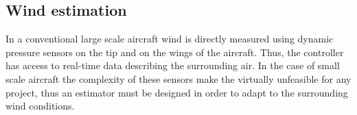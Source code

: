 \documentclass[twocolumn,showpacs,
    nofootinbib,aps,superscriptaddress,
    eqsecnum,prd,showkeys,10pt,floatfix]{revtex4}
\begin{document}
\subsection{Wind estimation}
\par
In a conventional large scale aircraft wind is directly measured using dynamic
pressure sensors on the tip and on the wings of the aircraft. Thus, the
controller has access to real-time data describing the surrounding air. In the
case of small scale aircraft the complexity of these sensors make the virtually
unfeasible for any project, thus an estimator must be designed in order to
adapt to the surrounding wind conditions.
\end{document}
